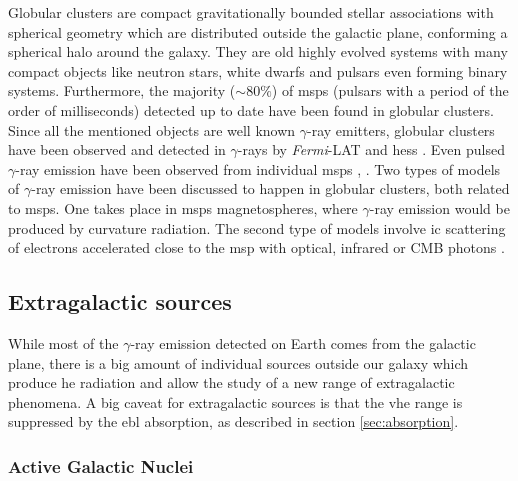 \documentclass[main.tex]{subfiles}
\begin{document}
Globular clusters are compact gravitationally bounded stellar associations with spherical geometry which are distributed outside the galactic plane, conforming a spherical halo around the galaxy. They are old highly evolved systems with many compact objects like neutron stars, white dwarfs and pulsars even forming binary systems. Furthermore, the majority  ($\sim 80\%$) of \glspl{msp} (pulsars with a period of the order of milliseconds) detected up to date have been found in globular clusters.\\
Since all the mentioned objects are well known $\gamma$-ray emitters, globular clusters have been observed and  detected in $\gamma$-rays by \textit{Fermi}-LAT \cite{2010globularclusterspopulationfermi} and \gls{hess}  \cite{2013globularclustersHESS}. Even pulsed $\gamma$-ray emission have been observed from individual \glspl{msp} \cite{2011detectionpulsationglobularcluster}, \cite{2013PulsedemissionfromGlobularM28}. 
Two types of models of $\gamma$-ray emission have been discussed to happen in globular clusters, both related to \glspl{msp}. One takes place in \glspl{msp} magnetospheres, where $\gamma$-ray emission would be produced by curvature radiation. The second type of models involve \gls{ic} scattering of electrons accelerated close to the \gls{msp} with optical, infrared or CMB photons \cite{2016GlobularClustersFermi}.  
\subsection{Extragalactic sources}

While most of the $\gamma$-ray emission detected on Earth comes from the galactic plane, there is a big amount of individual sources outside our galaxy which produce \gls{he} radiation and allow the study of a new range of extragalactic phenomena. A big caveat for extragalactic sources is that the \gls{vhe} range is suppressed by the \gls{ebl} absorption, as described in section \ref{sec:absorption}.

\subsubsection{Active Galactic Nuclei}
\end{document}
